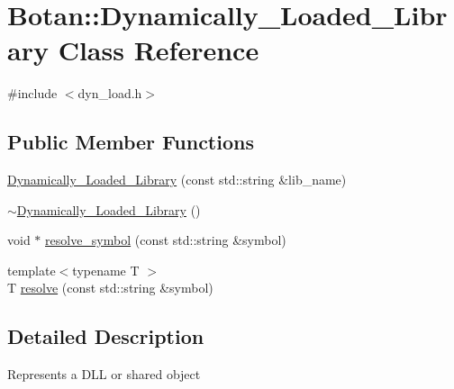 \hypertarget{classBotan_1_1Dynamically__Loaded__Library}{\section{Botan\-:\-:Dynamically\-\_\-\-Loaded\-\_\-\-Library Class Reference}
\label{classBotan_1_1Dynamically__Loaded__Library}
}


{\ttfamily \#include $<$dyn\-\_\-load.\-h$>$}

\subsection*{Public Member Functions}
\begin{DoxyCompactItemize}
\item 
\hyperlink{classBotan_1_1Dynamically__Loaded__Library_a225032421baec5fcc6230f191075a8cd}{Dynamically\-\_\-\-Loaded\-\_\-\-Library} (const std\-::string \&lib\-\_\-name)
\item 
\hyperlink{classBotan_1_1Dynamically__Loaded__Library_aef04b698fe04e37566f184549db32267}{$\sim$\-Dynamically\-\_\-\-Loaded\-\_\-\-Library} ()
\item 
void $\ast$ \hyperlink{classBotan_1_1Dynamically__Loaded__Library_a4001c885a4db6e3f23db90809dd805cb}{resolve\-\_\-symbol} (const std\-::string \&symbol)
\item 
{\footnotesize template$<$typename T $>$ }\\T \hyperlink{classBotan_1_1Dynamically__Loaded__Library_ae3c3c2dca75e532f695a8e62bb06d720}{resolve} (const std\-::string \&symbol)
\end{DoxyCompactItemize}


\subsection{Detailed Description}
Represents a D\-L\-L or shared object 

